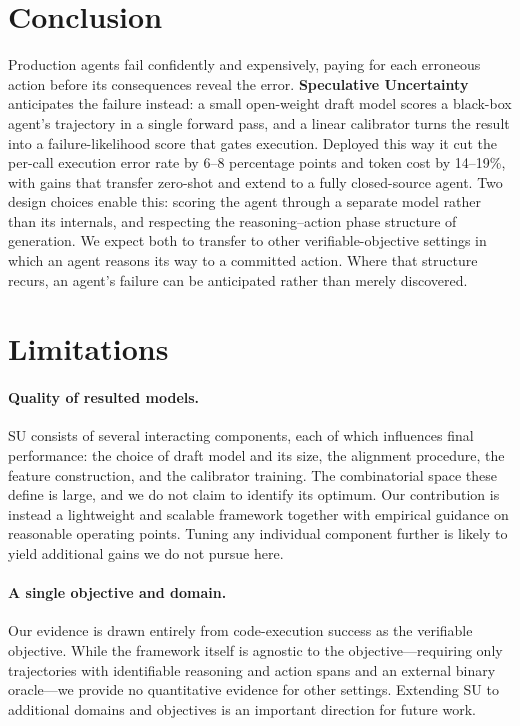\documentclass[11pt]{article}
\newcommand{\Hnumber}[1]{#1}
\begin{document}
\section{Conclusion}
\label{sec:conclusion}

Production agents fail confidently and expensively, paying for each erroneous action before its consequences reveal the error. \textbf{Speculative Uncertainty} anticipates the failure instead: a small open-weight
draft model scores a black-box agent's trajectory in a single forward pass, and a linear calibrator
turns the result into a failure-likelihood score that gates execution. Deployed this way it cut the per-call execution error rate by \Hnumber{6--8} percentage points and token cost by \Hnumber{14--19}\%, with gains that transfer
zero-shot and extend to a fully closed-source agent.
Two design choices enable this:
scoring the agent through a separate model rather than its internals, and respecting the
reasoning--action phase structure of generation. We expect both to transfer to other
verifiable-objective settings in which an agent reasons its way to a committed action. Where that
structure recurs, an agent's failure can be anticipated rather than merely discovered.

\section*{Limitations}

\paragraph{Quality of resulted models.}
SU consists of several interacting components, each of which influences final
performance: the choice of draft model and its size, the
alignment procedure, the feature
construction, and the calibrator training. The combinatorial space these define is large,
and we do not claim to identify its optimum. Our contribution is instead a
lightweight and scalable framework together with empirical guidance on
reasonable operating points. Tuning any individual component further is likely to yield additional gains we do not pursue here.

\paragraph{A single objective and domain.}
Our evidence is drawn entirely from code-execution success as the verifiable
objective. While the framework itself is agnostic to the objective---requiring
only trajectories with identifiable reasoning and action spans and an external
binary oracle---we provide no quantitative evidence for other settings.
Extending SU to additional domains and objectives is an important direction for future work.
\end{document}
